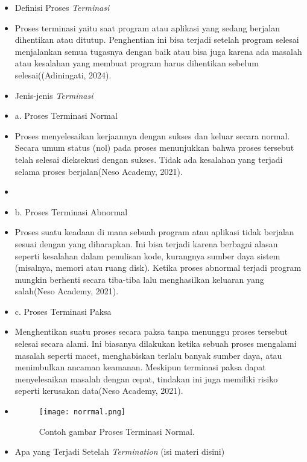 \documentclass[12pt]{article}
\begin{document}
\begin{itemize}
    \item Definisi Proses \textit{Terminasi}
    \item[] 
Proses terminasi yaitu saat program atau aplikasi yang sedang berjalan dihentikan atau ditutup. Penghentian ini bisa terjadi setelah program selesai menjalankan semua tugasnya dengan baik atau bisa juga karena ada masalah atau kesalahan yang membuat program harus dihentikan sebelum selesai((Adiningati, 2024).

    \item Jenis-jenis \textit{Terminasi}
    \item[] 
a. Proses Terminasi Normal
     \item[]
Proses menyelesaikan kerjaannya dengan sukses dan keluar secara normal. Secara umum status (nol) pada proses menunjukkan bahwa proses tersebut telah selesai dieksekusi dengan sukses. Tidak ada kesalahan yang terjadi selama proses berjalan(Neso Academy, 2021).
     \item[]
     \item[] 
b. Proses Terminasi Abnormal
     \item[]
Proses suatu keadaan di mana sebuah program atau aplikasi tidak berjalan sesuai dengan yang diharapkan. Ini bisa terjadi karena berbagai alasan seperti kesalahan dalam penulisan kode, kurangnya sumber daya sistem (misalnya, memori atau ruang disk). Ketika proses abnormal terjadi program mungkin berhenti secara tiba-tiba lalu menghasilkan keluaran yang salah(Neso Academy, 2021). 
     \item[]
c. Proses Terminasi Paksa
     \item[]
Menghentikan suatu proses secara paksa tanpa menunggu proses tersebut selesai secara alami. Ini biasanya dilakukan ketika sebuah proses mengalami masalah seperti macet, menghabiskan terlalu banyak sumber daya, atau menimbulkan ancaman keamanan. Meskipun terminasi paksa dapat menyelesaikan masalah dengan cepat, tindakan ini juga memiliki risiko seperti kerusakan data(Neso Academy, 2021).
    \item[]

\begin{figure}[h]
\centering
\texttt{[image: norrmal.png]}
\caption{Contoh gambar Proses Terminasi Normal.}
\end{figure}

    \item Apa yang Terjadi Setelah \textit{Termination}
    (isi materi disini)
\end{itemize}
\end{document}
